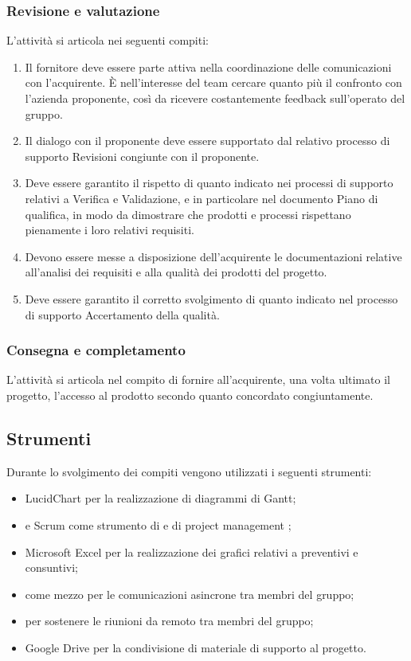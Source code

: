 \subsubsection{Revisione e valutazione}
L'attività si articola nei seguenti compiti:
\begin{enumerate}
    \item Il fornitore deve essere parte attiva nella coordinazione delle comunicazioni con l'acquirente. È nell'interesse del team cercare quanto più il confronto con l'azienda proponente, così da ricevere costantemente feedback sull'operato del gruppo.
    \item Il dialogo con il proponente deve essere supportato dal relativo processo di supporto Revisioni congiunte con il proponente.
    \item Deve essere garantito il rispetto di quanto indicato nei processi di supporto relativi a Verifica e Validazione, e in particolare nel documento Piano di qualifica, in modo da dimostrare che prodotti e processi rispettano pienamente i loro relativi requisiti.
    \item Devono essere messe a disposizione dell'acquirente le documentazioni relative all'analisi dei requisiti e alla qualità dei prodotti del progetto.
    \item Deve essere garantito il corretto svolgimento di quanto indicato nel processo di supporto Accertamento della qualità.
\end{enumerate}

\subsubsection{Consegna e completamento}
L'attività si articola nel compito di fornire all'acquirente, una volta ultimato il progetto, l'accesso al prodotto secondo quanto concordato congiuntamente.


\subsection{Strumenti}
Durante lo svolgimento dei compiti vengono utilizzati i seguenti strumenti:
\begin{itemize}
    \item LucidChart per la realizzazione di diagrammi di Gantt;
    \item {} e Scrum come strumento di  e di project management ; 
    \item Microsoft Excel per la realizzazione dei grafici relativi a preventivi e consuntivi;
    \item {} come mezzo per le comunicazioni asincrone tra membri del gruppo;
    \item {} per sostenere le riunioni da remoto tra membri del gruppo;
    \item Google Drive per la condivisione di materiale di supporto al progetto.
\end{itemize}

